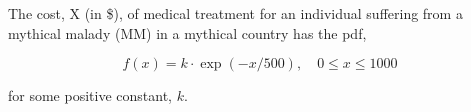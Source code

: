 


\renewcommand\assignment{Worksheet 1, Due February 15, 4:15pm}


    \iffalse
    \begin{equation*}
        \begin{gathered}
            Equations go here.
        \end{gathered}
    \end{equation*}

    \resizebox{\hsize}{!}{$Long equation goes here$}

    \begin{multicol*}{# of columns}
    \end{multicol*}

    \horizontal

    \fi


    The cost, X (in \$), of medical treatment for an individual suffering from a mythical malady (MM) in a mythical country has the pdf,

    \begin{equation*}
        f(x) = k \cdot \exp(-x/500), \quad 0 \leq x \leq 1000
    \end{equation*}

    for some positive constant, $k$.

